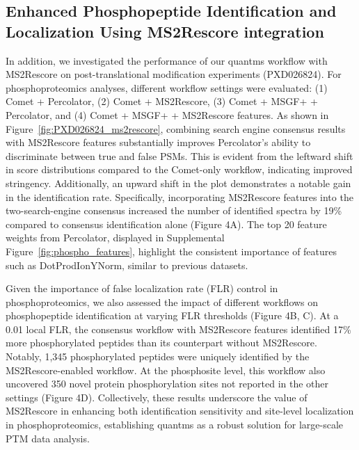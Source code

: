 \documentclass[12pt]{article}
\begin{document}
\subsection{Enhanced Phosphopeptide Identification and Localization Using MS2Rescore integration}
In addition, we investigated the performance of our quantms workflow with MS2Rescore on post-translational modification experiments (PXD026824). For phosphoproteomics analyses, different workflow settings were evaluated: (1) Comet + Percolator, (2) Comet + MS2Rescore, (3) Comet + MSGF+ + Percolator, and (4) Comet + MSGF+ + MS2Rescore features. As shown in Figure~\ref{fig:PXD026824_ms2rescore}, combining search engine consensus results with MS2Rescore features substantially improves Percolator's ability to discriminate between true and false PSMs. This is evident from the leftward shift in score distributions compared to the Comet-only workflow, indicating improved stringency. Additionally, an upward shift in the plot demonstrates a notable gain in the identification rate. Specifically, incorporating MS2Rescore features into the two-search-engine consensus increased the number of identified spectra by 19\% compared to consensus identification alone (Figure 4A). The top 20 feature weights from Percolator, displayed in Supplemental Figure~\ref{fig:phospho_features}, highlight the consistent importance of features such as DotProdIonYNorm, similar to previous datasets.

Given the importance of false localization rate (FLR) control in phosphoproteomics, we also assessed the impact of different workflows on phosphopeptide identification at varying FLR thresholds (Figure 4B, C). At a 0.01 local FLR, the consensus workflow with MS2Rescore features identified 17\% more phosphorylated peptides than its counterpart without MS2Rescore. Notably, 1,345 phosphorylated peptides were uniquely identified by the MS2Rescore-enabled workflow. At the phosphosite level, this workflow also uncovered 350 novel protein phosphorylation sites not reported in the other settings (Figure 4D). Collectively, these results underscore the value of MS2Rescore in enhancing both identification sensitivity and site-level localization in phosphoproteomics, establishing quantms as a robust solution for large-scale PTM data analysis.
\end{document}
